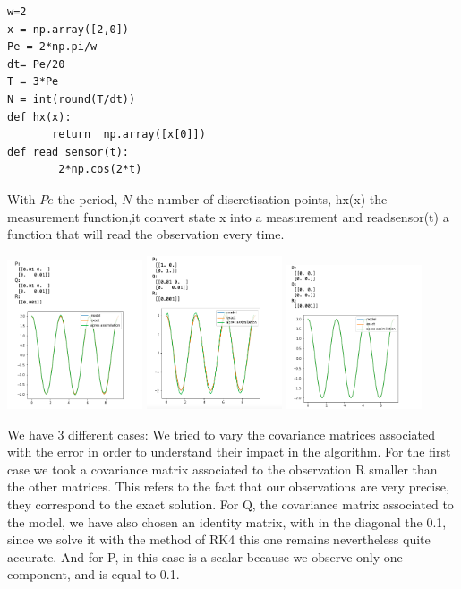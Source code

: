 \begin{lstlisting}
w=2 
x = np.array([2,0])
Pe = 2*np.pi/w
dt= Pe/20
T = 3*Pe
N = int(round(T/dt))
def hx(x):
       return  np.array([x[0]])
def read_sensor(t):
        2*np.cos(2*t)
\end{lstlisting}
With $Pe$ the period, $N$ the number of discretisation points, hx(x) the measurement function,it convert state x into a measurement and readsensor(t) a function that will read the observation every time.
\begin{center}
		\includegraphics[width=0.3\textwidth]{"images/oscillator1.png"}
		\includegraphics[width=0.3\textwidth]{"images/oscillator2.png"}
		\includegraphics[width=0.3\textwidth]{"images/oscillator3.png"}
	\end{center}
We have 3 different cases:
We tried to vary the covariance matrices associated with the error in order to understand their impact in the algorithm. For the first case we took a covariance matrix associated to the observation R smaller than the other matrices. This refers to the fact that our observations are very precise, they correspond to the exact solution. For Q, the covariance matrix associated to the model, we have also chosen an identity matrix, with in the diagonal the 0.1, since we solve it with the method of RK4 this one remains nevertheless quite accurate. And for P, in this case is a scalar because we observe only one component, and is equal to 0.1.
